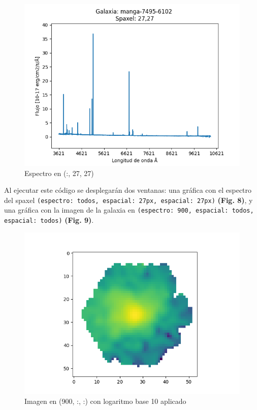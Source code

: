 \documentclass[9pt,twocolumn,a4paper]{opticajnl}
\begin{document}
\begin{figure}
    \centering
    \includegraphics[width=1\linewidth]{espectro1_python.png}
    \caption{Espectro en (:, 27, 27)}
    \label{fig:espectro1_python}
\end{figure}
Al ejecutar este código se desplegarán dos ventanas: una gráfica con el espectro del spaxel \texttt{(espectro: todos, espacial: 27px, espacial: 27px)} \textbf{(Fig. 8)}, y una gráfica con la imagen de la galaxia en \texttt{(espectro: 900, espacial: todos, espacial: todos)} \textbf{(Fig. 9)}.

\begin{figure}
    \centering
    \includegraphics[width=1\linewidth]{imagen1_python.png}
    \caption{Imagen en (900, :, :) con logaritmo base 10 aplicado}
    \label{fig:imagen1_python}
\end{figure}
\end{document}
